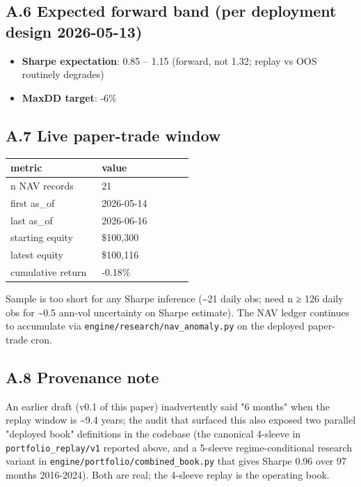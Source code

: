 \documentclass[11pt,a4paper]{article}
\begin{document}
\subsection{A.6 Expected forward band (per deployment design 2026-05-13)}

\begin{itemize}[leftmargin=*]
\item \textbf{Sharpe expectation}: 0.85 – 1.15 (forward, not 1.32; replay vs OOS routinely degrades)
\item \textbf{MaxDD target}: -6\%
\end{itemize}

\subsection{A.7 Live paper-trade window}

\begin{center}
\small
\begin{tabular}{p{0.475\linewidth}p{0.475\linewidth}}
\toprule
\textbf{metric} & \textbf{value} \\
\midrule
n NAV records & 21 \\
first as\_of & 2026-05-14 \\
last as\_of & 2026-06-16 \\
starting equity & \$100,300 \\
latest equity & \$100,116 \\
cumulative return & -0.18\% \\
\bottomrule
\end{tabular}
\end{center}

Sample is too short for any Sharpe inference (\textasciitilde{}21 daily obs; need n ≥ 126 daily obs for \textasciitilde{}0.5 ann-vol uncertainty on Sharpe estimate). The NAV ledger continues to accumulate via \texttt{engine/research/nav\_anomaly.py} on the deployed paper-trade cron.

\subsection{A.8 Provenance note}

An earlier draft (v0.1 of this paper) inadvertently said "6 months" when the replay window is \textasciitilde{}9.4 years; the audit that surfaced this also exposed two parallel "deployed book" definitions in the codebase (the canonical 4-sleeve in \texttt{portfolio\_replay/v1} reported above, and a 5-sleeve regime-conditional research variant in \texttt{engine/portfolio/combined\_book.py} that gives Sharpe 0.96 over 97 months 2016-2024). Both are real; the 4-sleeve replay is the operating book.
\end{document}
